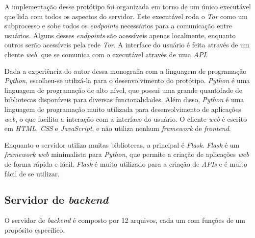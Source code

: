 A implementação desse protótipo foi organizada em torno de um único executável que lida com todos os aspectos do servidor. Este executável roda o \textit{Tor} como um subprocesso e sobe todos os \textit{endpoints} necessários para a comunicação entre usuários. Alguns desses \textit{endpoints} são acessíveis apenas localmente, enquanto outros serão acessíveis pela rede \textit{Tor}. A interface do usuário é feita através de um cliente \textit{web}, que se comunica com o executável através de uma \textit{API}.

Dada a experiência do autor dessa monografia com a linguagem de programação \textit{Python}, escolheu-se utilizá-la para o desenvolvimento do protótipo. \textit{Python} é uma linguagem de programação de alto nível, que possui uma grande quantidade de bibliotecas disponíveis para diversas funcionalidades. Além disso, \textit{Python} é uma linguagem de programação muito utilizada para desenvolvimento de aplicações \textit{web}, o que facilita a interação com a interface do usuário. O cliente \textit{web} é escrito em \textit{HTML}, \textit{CSS} e \textit{JavaScript}, e não utiliza nenhum \textit{framework} de \textit{frontend}.

Enquanto o servidor utiliza muitas bibliotecas, a principal é \textit{Flask}. \textit{Flask} é um \textit{framework web} minimalista para \textit{Python}, que permite a criação de aplicações \textit{web} de forma rápida e fácil. \textit{Flask} é muito utilizado para a criação de \textit{APIs} e é muito fácil de se utilizar.

\subsection{Servidor de \textit{backend}}

O servidor de \textit{backend} é composto por 12 arquivos, cada um com funções de um propósito específico.

